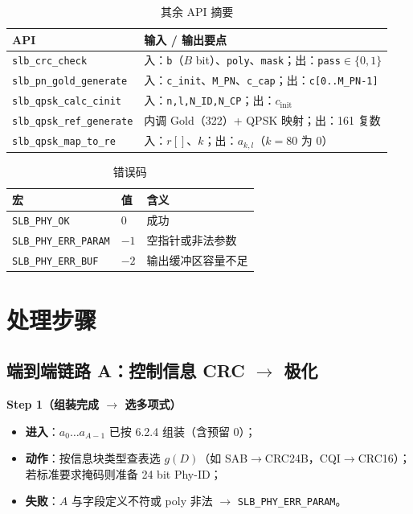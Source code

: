 \documentclass[11pt,a4paper]{ctexart}
\begin{document}
\begin{longtable}{L{3.5cm}L{10cm}}
\caption{其余 API 摘要\label{tab:6513-if-rest}} \\
\toprule
\textbf{API} & \textbf{输入 / 输出要点} \\
\midrule
\texttt{slb\_crc\_check} & 入：\texttt{b}（$B$ bit）、\texttt{poly}、\texttt{mask}；出：\texttt{pass}$\in\{0,1\}$ \\
\texttt{slb\_pn\_gold\_generate} & 入：\texttt{c\_init}、\texttt{M\_PN}、\texttt{c\_cap}；出：\texttt{c[0..M\_PN-1]} \\
\texttt{slb\_qpsk\_calc\_cinit} & 入：\texttt{n,l,N\_ID,N\_CP}；出：$c_{\mathrm{init}}$ \\
\texttt{slb\_qpsk\_ref\_generate} & 内调 Gold（322）+ QPSK 映射；出：161 复数 \\
\texttt{slb\_qpsk\_map\_to\_re} & 入：$r[]$、$k$；出：$a_{k,l}$（$k{=}80$ 为 0） \\
\bottomrule
\end{longtable}

\begin{longtable}{L{4cm}L{2cm}L{8cm}}
\caption{错误码\label{tab:6513-err}} \\
\toprule
\textbf{宏} & \textbf{值} & \textbf{含义} \\
\midrule
\texttt{SLB\_PHY\_OK} & 0 & 成功 \\
\texttt{SLB\_PHY\_ERR\_PARAM} & $-1$ & 空指针或非法参数 \\
\texttt{SLB\_PHY\_ERR\_BUF} & $-2$ & 输出缓冲区容量不足 \\
\bottomrule
\end{longtable}

\section{处理步骤}

\subsection{端到端链路 A：控制信息 CRC $\rightarrow$ 极化}

\textbf{Step 1（组装完成 $\rightarrow$ 选多项式）}
\begin{itemize}[nosep]
  \item \textbf{进入}：$a_0\ldots a_{A-1}$ 已按 6.2.4 组装（含预留 0）；
  \item \textbf{动作}：按信息块类型查表选 $g(D)$（如 SAB$\rightarrow$CRC24B，CQI$\rightarrow$CRC16）；若标准要求掩码则准备 24 bit Phy-ID；
  \item \textbf{失败}：$A$ 与字段定义不符或 poly 非法 $\rightarrow$ \texttt{SLB\_PHY\_ERR\_PARAM}。
\end{itemize}
\end{document}
